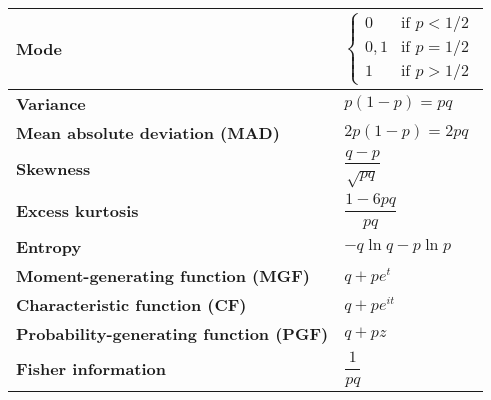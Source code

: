 \begin{customTableWrapper}{2}
\begin{longtable}{|m{6cm}|p{9cm}|}
    \textbf{Mode} & 
    ${\displaystyle {\begin{cases}0&{\text{if }}p<1/2\\0,1&{\text{if }}p=1/2\\1&{\text{if }}p>1/2\end{cases}}}$
    \\ \hline

    \textbf{Variance} &
    ${\displaystyle p(1-p)=pq}$
    \\ \hline

    \textbf{Mean absolute deviation (MAD)} &
    ${\displaystyle 2p(1-p)=2pq}$
    \\[1ex] \hline

    \textbf{Skewness} &
    ${\displaystyle {\dfrac {q-p}{\sqrt {pq}}}}$
    \\ \hline

    \textbf{Excess kurtosis} &
    ${\displaystyle {\dfrac {1-6pq}{pq}}}$
    \\ \hline

    \textbf{Entropy} &
    ${\displaystyle -q\ln q-p\ln p}$
    \\[1ex] \hline

    \textbf{Moment-generating function (MGF)} &
    ${\displaystyle q+pe^{t}}$
    \\[1ex] \hline

    \textbf{Characteristic function (CF)} &
    ${\displaystyle q+pe^{it}}$
    \\[1ex] \hline

    \textbf{Probability-generating function (PGF)} &
    ${\displaystyle q+pz}$
    \\[1ex] \hline

    \textbf{Fisher information} &
    ${\displaystyle {\dfrac {1}{pq}}}$
    \\[1ex] \hline


\end{longtable}
\end{customTableWrapper}























